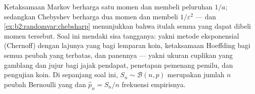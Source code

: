 \begin{problem}
\label{pb:b2:randomvar:1}
Ketaksamaan Markov berharga satu momen dan membeli peluruhan $1/a$;
sedangkan Chebyshev berharga dua momen dan membeli $1/\varepsilon^2$ ---
dan \cref{ex:b2:randomvar:chebsharp} menunjukkan bahwa itulah semua yang dapat
dibeli momen tersebut. Soal ini mendaki sisa tangganya:
yakni metode eksponensial (Chernoff) dengan lajunya yang \emph{}
bagi lemparan koin, ketaksamaan Hoeffding bagi semua peubah yang terbatas,
dan panennya --- yakni ukuran cuplikan yang gamblang dan jujur
bagi jajak pendapat, penetapan pemenang pemilu, dan pengujian koin.
 Di sepanjang soal ini, $S_n \sim
\mathcal B(n, p)$ merupakan jumlah $n$ peubah Bernoulli yang  dan $\widehat p_n = S_n/n$ frekuensi empirisnya.


\end{problem}
